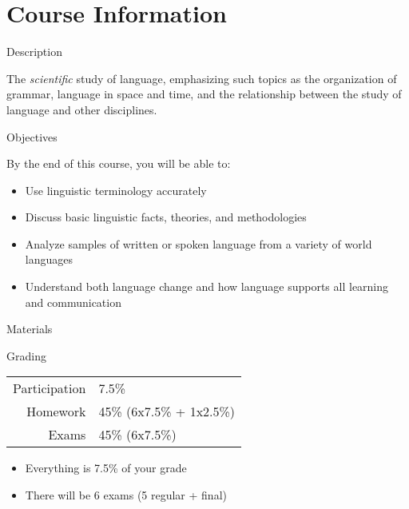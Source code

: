 \documentclass{beamer}
\subtitle[Welcome]{Welcome}
\begin{document}
  

  \section{Course Information}
    \begin{frame}{Description}
      \begin{block}{}
        The \emph{scientific} study of language, emphasizing such topics as the organization of grammar, language in space and time, and the relationship between the study of language and other disciplines.
      \end{block}
    \end{frame}

    \begin{frame}{Objectives}
      \begin{block}{}
        By the end of this course, you will be able to:
        \begin{itemize}
          \item Use linguistic terminology accurately
          \item Discuss basic linguistic facts, theories, and methodologies
          \item Analyze samples of written or spoken language from a variety of world languages
          \item Understand both language change and how language supports all learning and communication
        \end{itemize}
      \end{block}
    \end{frame}

    \begin{frame}{Materials}
      \begin{block}{}
      \end{block}
    \end{frame}

    \begin{frame}{Grading}
      \begin{block}{}
        \begin{tabular}{r l}
          Participation & 7.5\%\\
          Homework      & 45\% (6x7.5\% + 1x2.5\%)\\
          Exams         & 45\% (6x7.5\%)
        \end{tabular}
      \end{block}
      \begin{block}{}
        \begin{itemize}
          \item Everything is 7.5\% of your grade
          \item There will be 6 exams (5 regular + final)
        \end{itemize}
      \end{block}
    \end{frame}
\end{document}
